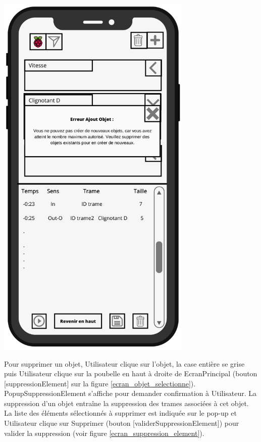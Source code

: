 \begin{minipage}{0.5\linewidth}
    \centering
    \includegraphics[width=0.7\textwidth]{sections/3_Exigences_specifiques/1_IHM/ihm/ecranErreurNombreObjet.png}
    \captionsetup{justification=centering}
    \label{ecran_principal_popup_erreur_nombre_objet}
\end{minipage} 

\newpage

Pour supprimer un objet, Utilisateur clique sur l'objet, la case entière se grise puis Utilisateur clique sur la poubelle en haut à droite de EcranPrincipal (bouton [suppressionElement] sur la figure \ref{ecran_objet_selectionne}). PopupSuppressionElement s'affiche pour demander confirmation à Utilisateur. La suppression d'un objet entraîne la suppression des trames associées à cet objet. La liste des éléments sélectionnés à supprimer est indiquée sur le pop-up et Utilisateur clique sur {\guillemetleft} Supprimer {\guillemetright} (bouton [validerSuppressionElement]) pour valider la suppression (voir figure \ref{ecran_suppression_element}).
 
